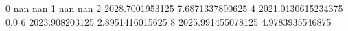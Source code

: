 0 nan nan
1 nan nan
2 2028.7001953125 7.6871337890625
4 2021.0130615234375 0.0
6 2023.908203125 2.8951416015625
8 2025.991455078125 4.9783935546875
